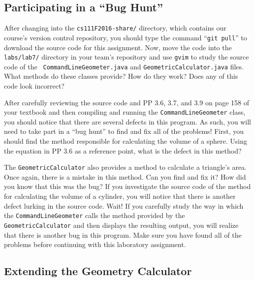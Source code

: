\vspace*{-.1in}
\subsection*{Participating in a ``Bug Hunt''}

After changing into the {\tt cs111F2016-share/} directory, which contains our course's version control repository, you
should type the command ``{\tt git pull}'' to download the source code for this assignment. Now, move the code into the
{\tt labs/lab7/} directory in your team's repository and use {\tt gvim} to study the source code of the {\tt
CommandLineGeometer.java} and {\tt GeometricCalculator.java} files. What methods do these classes provide? How do they
work? Does any of this code look incorrect?

After carefully reviewing the source code and PP 3.6, 3.7, and 3.9 on page 158 of your textbook and then compiling and
running the {\tt CommandLineGeometer} class, you should notice that there are several defects in this program. As
such, you will need to take part in a ``bug hunt'' to find and fix all of the problems! First, you should find the
method responsible for calculating the volume of a sphere. Using the equation in PP 3.6 as a reference point, what is
the defect in this method?

The {\tt GeometricCalculator} also provides a method to calculate a triangle's area.  Once again, there is a
mistake in this method.  Can you find and fix it? How did you know that this was the bug? If you investigate the source
code of the method for calculating the volume of a cylinder, you will notice that there is another defect lurking in the
source code. Wait! If you carefully study the way in which the {\tt CommandLineGeometer} calls the method
provided by the {\tt GeometricCalculator} and then displays the resulting output, you will realize that there is another
bug in this program. Make sure you have found all of the problems before continuing with this laboratory assignment.

\vspace*{-.1in}
\subsection*{Extending the Geometry Calculator}
\vspace*{-.05in}

